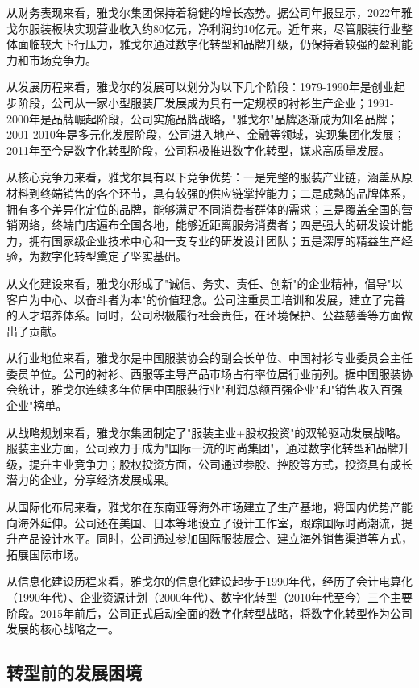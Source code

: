 \documentclass[12pt,a4paper]{article}
\begin{document}
从财务表现来看，雅戈尔集团保持着稳健的增长态势。据公司年报显示，2022年雅戈尔服装板块实现营业收入约80亿元，净利润约10亿元。近年来，尽管服装行业整体面临较大下行压力，雅戈尔通过数字化转型和品牌升级，仍保持着较强的盈利能力和市场竞争力。

从发展历程来看，雅戈尔的发展可以划分为以下几个阶段：1979-1990年是创业起步阶段，公司从一家小型服装厂发展成为具有一定规模的衬衫生产企业；1991-2000年是品牌崛起阶段，公司实施品牌战略，"雅戈尔"品牌逐渐成为知名品牌；2001-2010年是多元化发展阶段，公司进入地产、金融等领域，实现集团化发展；2011年至今是数字化转型阶段，公司积极推进数字化转型，谋求高质量发展。

从核心竞争力来看，雅戈尔具有以下竞争优势：一是完整的服装产业链，涵盖从原材料到终端销售的各个环节，具有较强的供应链掌控能力；二是成熟的品牌体系，拥有多个差异化定位的品牌，能够满足不同消费者群体的需求；三是覆盖全国的营销网络，终端门店遍布全国各地，能够近距离服务消费者；四是强大的研发设计能力，拥有国家级企业技术中心和一支专业的研发设计团队；五是深厚的精益生产经验，为数字化转型奠定了坚实基础。

从文化建设来看，雅戈尔形成了"诚信、务实、责任、创新"的企业精神，倡导"以客户为中心、以奋斗者为本"的价值理念。公司注重员工培训和发展，建立了完善的人才培养体系。同时，公司积极履行社会责任，在环境保护、公益慈善等方面做出了贡献。

从行业地位来看，雅戈尔是中国服装协会的副会长单位、中国衬衫专业委员会主任委员单位。公司的衬衫、西服等主导产品市场占有率位居行业前列。据中国服装协会统计，雅戈尔连续多年位居中国服装行业"利润总额百强企业"和"销售收入百强企业"榜单。

从战略规划来看，雅戈尔集团制定了"服装主业+股权投资"的双轮驱动发展战略。服装主业方面，公司致力于成为"国际一流的时尚集团"，通过数字化转型和品牌升级，提升主业竞争力；股权投资方面，公司通过参股、控股等方式，投资具有成长潜力的企业，分享经济发展成果。

从国际化布局来看，雅戈尔在东南亚等海外市场建立了生产基地，将国内优势产能向海外延伸。公司还在美国、日本等地设立了设计工作室，跟踪国际时尚潮流，提升产品设计水平。同时，公司通过参加国际服装展会、建立海外销售渠道等方式，拓展国际市场。

从信息化建设历程来看，雅戈尔的信息化建设起步于1990年代，经历了会计电算化（1990年代）、企业资源计划（2000年代）、数字化转型（2010年代至今）三个主要阶段。2015年前后，公司正式启动全面的数字化转型战略，将数字化转型作为公司发展的核心战略之一。

\subsection{转型前的发展困境}
\end{document}
